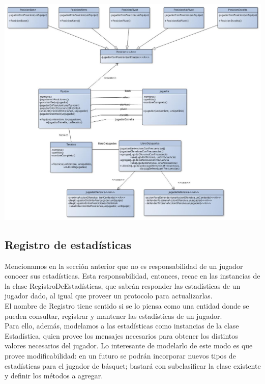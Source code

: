 \begin{center}
\includegraphics[scale=0.30]{diseno/equipo.jpg} 
\end{center}

\subsection{Registro de estadísticas}
Mencionamos en la sección anterior que no es responsabilidad de un jugador conocer sus estadísticas. Esta responsabilidad, entonces, recae en las instancias de la clase RegistroDeEstadísticas, que sabrán responder las estadísticas de un jugador dado, al igual que proveer un protocolo para actualizarlas.\\
El nombre de Registro tiene sentido si se lo piensa como una entidad donde se pueden consultar, registrar y mantener las estadísticas de un jugador.\\
Para ello, además, modelamos a las estadísticas como instancias de la clase Estadística, quien provee los mensajes necesarios para obtener los distintos valores necesarios del jugador. Lo interesante de modelarlo de este modo es que provee modificabilidad: en un futuro se podrán incorporar nuevos tipos de estadísticas para el jugador de básquet; bastará con subclasificar la clase existente y definir los métodos a agregar.\\

